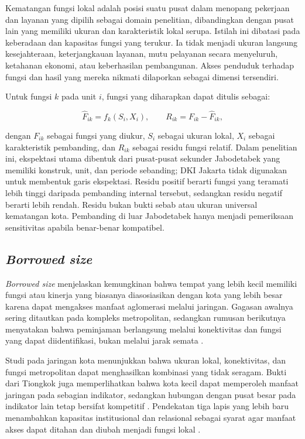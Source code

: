 \documentclass[11pt,a4paper,oneside,openany,indonesian]{report}
\begin{document}
Kematangan fungsi lokal adalah posisi suatu pusat dalam menopang pekerjaan dan layanan yang dipilih sebagai domain penelitian, dibandingkan dengan pusat lain yang memiliki ukuran dan karakteristik lokal serupa. Istilah ini dibatasi pada keberadaan dan kapasitas fungsi yang terukur. Ia tidak menjadi ukuran langsung kesejahteraan, keterjangkauan layanan, mutu pelayanan secara menyeluruh, ketahanan ekonomi, atau keberhasilan pembangunan. Akses penduduk terhadap fungsi dan hasil yang mereka nikmati dilaporkan sebagai dimensi tersendiri.

Untuk fungsi $k$ pada unit $i$, fungsi yang diharapkan dapat ditulis sebagai:

\[
\widehat{F}_{ik}=f_k(S_i,X_i), \qquad R_{ik}=F_{ik}-\widehat{F}_{ik},
\]

\noindent dengan $F_{ik}$ sebagai fungsi yang diukur, $S_i$ sebagai ukuran lokal, $X_i$ sebagai karakteristik pembanding, dan $R_{ik}$ sebagai residu fungsi relatif. Dalam penelitian ini, ekspektasi utama dibentuk dari pusat-pusat sekunder Jabodetabek yang memiliki konstruk, unit, dan periode sebanding; DKI Jakarta tidak digunakan untuk membentuk garis ekspektasi. Residu positif berarti fungsi yang teramati lebih tinggi daripada pembanding internal tersebut, sedangkan residu negatif berarti lebih rendah. Residu bukan bukti sebab atau ukuran universal kematangan kota. Pembanding di luar Jabodetabek hanya menjadi pemeriksaan sensitivitas apabila benar-benar kompatibel.

\subsection{\textit{Borrowed size}}

\textit{Borrowed size} menjelaskan kemungkinan bahwa tempat yang lebih kecil memiliki fungsi atau kinerja yang biasanya diasosiasikan dengan kota yang lebih besar karena dapat mengakses manfaat aglomerasi melalui jaringan. Gagasan awalnya sering ditautkan pada kompleks metropolitan, sedangkan rumusan berikutnya menyatakan bahwa peminjaman berlangsung melalui konektivitas dan fungsi yang dapat diidentifikasi, bukan melalui jarak semata \parencite{meijersburger2017,meijersetal2016,burgeretal2015}.

Studi pada jaringan kota menunjukkan bahwa ukuran lokal, konektivitas, dan fungsi metropolitan dapat menghasilkan kombinasi yang tidak seragam. Bukti dari Tiongkok juga memperlihatkan bahwa kota kecil dapat memperoleh manfaat jaringan pada sebagian indikator, sedangkan hubungan dengan pusat besar pada indikator lain tetap bersifat kompetitif \parencite{yangzhudu2022,zhaomiaoxi2022}. Pendekatan tiga lapis yang lebih baru menambahkan kapasitas institusional dan relasional sebagai syarat agar manfaat akses dapat ditahan dan diubah menjadi fungsi lokal \parencite{otsuka2025}.
\end{document}
